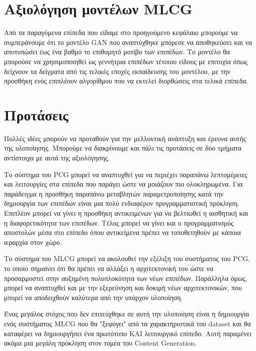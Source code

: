 \section{Αξιολόγηση μοντέλων MLCG}
\par
Από τα παραγόμενα επίπεδα που είδαμε στο προηγούμενο κεφάλαιο μπορούμε να συμπεράνουμε ότι το μοντέλο GAN που αναπτύχθηκε μπόρεσε να αποθηκεύσει και να αποτυπώσει έως ένα βαθμό το επιθυμητό μοτίβο των επιπέδων. Το μοντέλο θα μπορούσε να χρησιμοποιηθεί ως γεννήτρια επιπέδων τέτοιου είδους με επιτυχία όπως δείχνουν τα δείγματα από τις τελικές εποχές εκπαίδευσης του μοντέλου, με την προσθήκη ενός επιπλέουν αλγορίθμου που να εκτελεί διορθώσεις στα τελικά επίπεδα.


\section{Προτάσεις}
\par
Πολλές ιδέες μπορούν να προταθούν για την μελλοντική ανάπτυξη και έρευνα αυτής της υλοποίησης. Μπορούμε να διακρίνουμε και πάλι τις προτάσεις σε δύο τμήματα  αντίστοιχα με αυτά της αξιολόγησης.
\par
Το σύστημα του PCG μπορεί να αναπτυχθεί για να περιέχει παραπάνω λεπτομέρειες και λειτουργίες στα επίπεδα που παράγει ώστε να μοιάζουν πιο ολοκληρωμένα. Για παράδειγμα η προσθήκη παραπάνω μεταβλητών παραμετροποίησης κατά την δημιουργία των επιπέδων είναι μια πολύ ενδιαφέρον προγραμματιστική πρόκληση. Επιπλέον μπορεί να γίνει η προσθήκη αντικειμένων για να βελτιωθεί η αισθητική και η διαφορετικότητα των επιπέδων. Τέλος μπορεί να γίνει και ο προγραμματισμός αποστολών μέσα στο επίπεδο όπου αντικείμενα πρέπει να τοποθετηθούν με κάποια ιεραρχία στον χώρο.
\par
Το σύστημα του MLCG μπορεί να ακολουθεί την εξέλιξη του συστήματος του PCG, το οποίο σημαίνει ότι θα πρέπει να αλλάξει η αρχιτεκτονική του ώστε να προσαρμοστεί στην αυξημένη πολυπλοκότητα των νέων επιπέδων. Παράλληλα όμως, μπορεί να αναπτυχθεί και με την εξερεύνηση και δοκιμή νέων αρχιτεκτονικών, που μπορεί να αποδειχθούν καλύτερα από την υπάρχον υλοποίηση.
\par
Ένας μεγάλος στόχος που δεν επιτεύχθηκε σε αυτή την υλοποίηση είναι η δημιουργία ενός συστήματος MLCG που θα "ξεφύγει" από τα χαρακτηριστικά του dataset και θα καταφέρει να δημιουργήσει ένα πρωτότυπο ΚΑΙ λειτουργικό επίπεδο. Αυτή παραμένει ακόμα μια μεγάλη πρόκληση στον τομέα του Content Generation.









